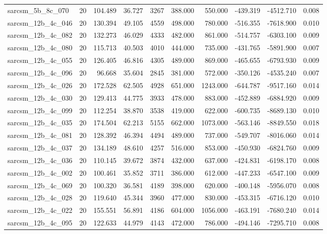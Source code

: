 \begin{tabular}{lrrrrrrrrr}
sarcsm\_5b\_8c\_070 & 20 & 104.489 & 36.727 & 3267 & 388.000 & 550.000 & -439.319 & -4512.710 & 0.008 \\
sarcsm\_12b\_4c\_046 & 20 & 130.394 & 49.105 & 4559 & 498.000 & 780.000 & -516.355 & -7618.900 & 0.010 \\
sarcsm\_12b\_4c\_082 & 20 & 132.273 & 46.029 & 4333 & 482.000 & 861.000 & -514.757 & -6303.100 & 0.009 \\
sarcsm\_12b\_4c\_080 & 20 & 115.713 & 40.503 & 4010 & 444.000 & 735.000 & -431.765 & -5891.900 & 0.007 \\
sarcsm\_12b\_4c\_055 & 20 & 126.405 & 46.816 & 4305 & 489.000 & 869.000 & -465.655 & -6793.930 & 0.009 \\
sarcsm\_12b\_4c\_096 & 20 & 96.668 & 35.604 & 2845 & 381.000 & 572.000 & -350.126 & -4535.240 & 0.007 \\
sarcsm\_12b\_4c\_026 & 20 & 172.528 & 62.505 & 4928 & 651.000 & 1243.000 & -644.787 & -9517.160 & 0.014 \\
sarcsm\_12b\_4c\_030 & 20 & 129.413 & 44.775 & 3933 & 478.000 & 883.000 & -452.889 & -6884.920 & 0.009 \\
sarcsm\_12b\_4c\_099 & 20 & 112.254 & 38.870 & 3538 & 419.000 & 622.000 & -600.735 & -8689.130 & 0.010 \\
sarcsm\_12b\_4c\_035 & 20 & 174.504 & 62.213 & 5155 & 662.000 & 1073.000 & -563.146 & -8849.550 & 0.018 \\
sarcsm\_12b\_4c\_081 & 20 & 128.392 & 46.394 & 4494 & 489.000 & 737.000 & -549.707 & -8016.060 & 0.014 \\
sarcsm\_12b\_4c\_037 & 20 & 134.189 & 48.610 & 4257 & 516.000 & 853.000 & -450.930 & -6824.760 & 0.009 \\
sarcsm\_12b\_4c\_036 & 20 & 110.145 & 39.672 & 3874 & 432.000 & 637.000 & -424.831 & -6198.170 & 0.008 \\
sarcsm\_12b\_4c\_002 & 20 & 100.461 & 35.852 & 3711 & 386.000 & 612.000 & -447.233 & -6547.100 & 0.009 \\
sarcsm\_12b\_4c\_069 & 20 & 100.320 & 36.581 & 4189 & 398.000 & 620.000 & -400.148 & -5956.070 & 0.008 \\
sarcsm\_12b\_4c\_028 & 20 & 119.640 & 45.344 & 3960 & 477.000 & 830.000 & -453.315 & -6716.120 & 0.010 \\
sarcsm\_12b\_4c\_022 & 20 & 155.551 & 56.891 & 4186 & 604.000 & 1056.000 & -463.191 & -7680.240 & 0.014 \\
sarcsm\_12b\_4c\_095 & 20 & 122.633 & 44.979 & 4143 & 472.000 & 786.000 & -494.146 & -7295.710 & 0.008 \\

\end{tabular}
